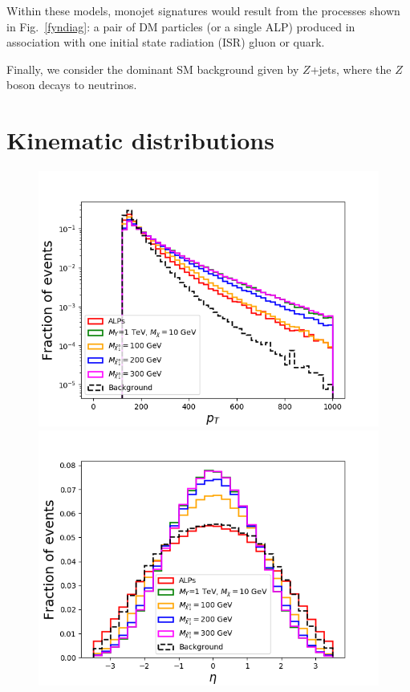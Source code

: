 \documentclass[prd,aps,letterpaper,floatfix,superscriptaddress,preprintnumbers,twocolumn,10pt,nofootinbib]{revtex4-1}
\begin{document}
Within these models, monojet signatures would result from the processes shown in Fig.~\ref{fyndiag}: a pair of DM particles (or a single ALP) produced in association with one initial state radiation (ISR) gluon or quark.   

Finally, we consider the dominant SM background given by $Z$+jets, where the $Z$ boson decays to neutrinos. 

\section{Kinematic distributions\label{kinematics}}

 
\begin{figure}[t!]
\centering
\includegraphics[scale=0.3]{figures/ptjallsb.png}
\includegraphics[scale=0.3]{figures/etajallsb.png}

\end{figure}
\end{document}
